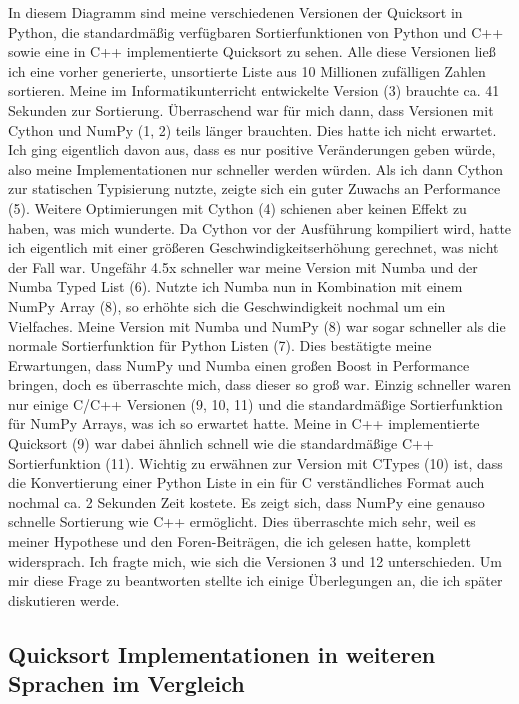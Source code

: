 \documentclass[11pt,a4paper]{article}
\begin{document}
In diesem Diagramm sind meine verschiedenen Versionen der Quicksort in Python,
die standardmäßig verfügbaren Sortierfunktionen von Python und C++
sowie eine in C++ implementierte Quicksort zu sehen.
Alle diese Versionen ließ ich eine vorher generierte, unsortierte Liste aus
10 Millionen zufälligen Zahlen sortieren.
Meine im Informatikunterricht entwickelte Version (3) brauchte ca. 41 Sekunden
zur Sortierung. Überraschend war für mich dann, dass Versionen mit Cython und NumPy
(1, 2) teils länger brauchten. Dies hatte ich nicht erwartet. Ich ging eigentlich davon aus,
dass es nur positive Veränderungen geben würde, also meine Implementationen nur schneller werden
würden. Als ich dann Cython zur statischen Typisierung nutzte, zeigte sich ein
guter Zuwachs an Performance (5). Weitere Optimierungen mit Cython (4)
schienen aber keinen Effekt zu haben, was mich wunderte.
Da Cython vor der Ausführung kompiliert wird, hatte ich eigentlich mit einer
größeren Geschwindigkeitserhöhung gerechnet, was nicht der Fall war.
Ungefähr 4.5x schneller war meine Version mit Numba und der Numba Typed List (6).
Nutzte ich Numba nun in Kombination mit einem NumPy Array (8), so erhöhte sich
die Geschwindigkeit nochmal um ein Vielfaches.
Meine Version mit Numba und NumPy (8) war sogar schneller als die normale
Sortierfunktion für Python Listen (7). Dies bestätigte meine Erwartungen,
dass NumPy und Numba einen großen Boost in Performance bringen,
doch es überraschte mich, dass dieser so groß war.
Einzig schneller waren nur einige C/C++ Versionen (9, 10, 11) und die
standardmäßige Sortierfunktion für NumPy Arrays, was ich so erwartet hatte.
Meine in C++ implementierte Quicksort (9) war dabei ähnlich schnell
wie die standardmäßige C++ Sortierfunktion (11).
Wichtig zu erwähnen zur Version mit CTypes (10) ist, dass die Konvertierung
einer Python Liste in ein für C verständliches Format auch nochmal ca. 2 Sekunden
Zeit kostete.
Es zeigt sich, dass NumPy eine genauso schnelle Sortierung wie C++ ermöglicht.
Dies überraschte mich sehr, weil es meiner Hypothese und den Foren-Beiträgen,
die ich gelesen hatte, komplett widersprach.
Ich fragte mich, wie sich die Versionen 3 und 12 unterschieden.
Um mir diese Frage zu beantworten stellte ich einige Überlegungen an,
die ich später diskutieren werde.

\subsection{Quicksort Implementationen in weiteren Sprachen im Vergleich}
\end{document}
